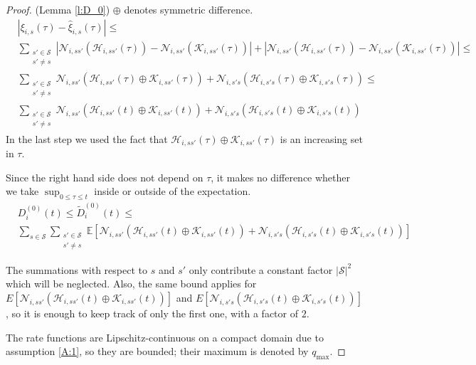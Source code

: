 \documentclass{article}
\newcommand{\E}{\mathbb{E}}
\newcommand{\1}[1]{{\mathds{1}}_{\left\{#1\right\}}}
\newcommand{\K}{\mathcal{K}}
\newcommand{\N}{\mathcal{N}}
\newcommand{\HH}{\mathcal{H}}
\renewcommand{\S}{\mathcal{S}}
\begin{document}
	\begin{proof} (Lemma \ref{l:D_0})
		$\oplus$ denotes symmetric difference.
		\begin{align*}
			& \left|\xi_{i,s}(\tau)-\hat{\xi}_{i,s}(\tau) \right| \leq \\ 
			&\sum_{\substack{s' \in \S \\ s' \neq s}} \left|\N_{i,ss'} \left(\HH_{i,ss'}(\tau) \right)-\N_{i,ss'} \left(\K_{i,ss'}(\tau) \right) \right|+\left|\N_{i,ss'} \left(\HH_{i,ss'}(\tau) \right)-\N_{i,ss'} \left(\K_{i,ss'}(\tau) \right) \right| \leq \\
			&\sum_{\substack{s' \in \S \\ s' \neq s}} \N_{i,ss'} \left(\HH_{i,ss'}(\tau) \oplus \K_{i,ss'}(\tau)  \right)+\N_{i,s's} \left(\HH_{i,s's}(\tau) \oplus \K_{i,s's}(\tau)  \right) \leq \\
			&\sum_{\substack{s' \in \S \\ s' \neq s}} \N_{i,ss'} \left(\HH_{i,ss'}(t) \oplus \K_{i,ss'}(t)  \right)+\N_{i,s's} \left(\HH_{i,s's}(t) \oplus \K_{i,s's}(t)  \right)
		\end{align*}
		In the last step we used the fact that $\HH_{i,ss'}(\tau) \oplus \K_{i,ss'}(\tau)$ is an increasing set in $\tau$. 
		
		Since the right hand side does not depend on $\tau$, it makes no difference whether we take $\sup_{0 \leq \tau \leq t}$ inside or outside of the expectation.
		\begin{align*}
			&D_{i}^{(0)}(t) \leq \tilde{D}_{i}^{(0)}(t) \leq \\
			& \sum_{s \in \S} \sum_{\substack{s' \in \S \\ s' \neq s}} \E \left[ \N_{i,ss'} \left(\HH_{i,ss'}(t) \oplus \K_{i,ss'}(t)  \right)+\N_{i,s's} \left(\HH_{i,s's}(t) \oplus \K_{i,s's}(t)  \right) \right]
		\end{align*}
		
		The summations with respect to $s$ and $s'$ only contribute a constant factor $\left | \S \right |^2$ which will be neglected. Also, the same bound applies for $E \left[ \N_{i,ss'} \left(\HH_{i,ss'}(t) \oplus \K_{i,ss'}(t)  \right) \right]$ and $E \left[ \N_{i,s's} \left(\HH_{i,s's}(t) \oplus \K_{i,s's}(t)  \right) \right]$, so it is enough to keep track of only the first one, with a factor of $2$.
		
		The rate functions are Lipschitz-continuous on a compact domain due to assumption \eqref{A:1}, so they are bounded; their maximum is denoted by $q_{\max}$.
		

\end{proof}
\end{document}
